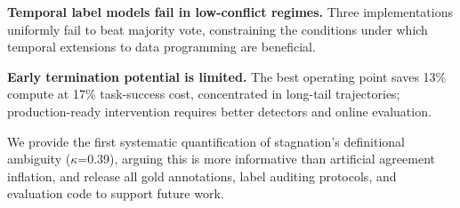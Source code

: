 \documentclass[11pt,a4paper]{article}
\begin{document}
\textbf{Temporal label models fail in low-conflict regimes.} Three implementations uniformly fail to beat majority vote, constraining the conditions under which temporal extensions to data programming are beneficial.

\textbf{Early termination potential is limited.} The best operating point saves 13\% compute at 17\% task-success cost, concentrated in long-tail trajectories; production-ready intervention requires better detectors and online evaluation.

We provide the first systematic quantification of stagnation's definitional ambiguity ($\kappa$=0.39), arguing this is more informative than artificial agreement inflation, and release all gold annotations, label auditing protocols, and evaluation code to support future work.




\end{document}
